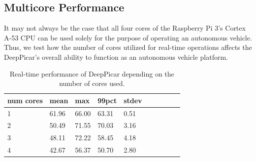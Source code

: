 

\subsection{Multicore Performance}
It may not always be the case that all four cores of the Raspberry Pi 3's Cortex A-53 CPU can be used 
solely for the purpose of operating an autonomous vehicle. Thus, we test how the number of cores 
utilized for real-time operations affects the DeepPicar's overall ability to function as an autonomous 
vehicle platform.

\begin{table}[h]
  \centering
  \begin{tabular} {| l | l | l | l | l | l | l | l | l | l |}
    \hline
    \textbf{num cores} & \textbf{mean} & \textbf{max} & \textbf{99pct} & \textbf{stdev} \\ \hline 
    1 & 61.96 & 66.00 & 63.31 & 0.51\\ \hline
    2 & 50.49 & 71.55 & 70.03 & 3.16 \\ \hline
    3 & 48.11 & 72.22 & 58.45 & 4.18 \\ \hline
    4 & 42.67 & 56.37 & 50.70 & 2.80 \\
    \hline
  \end{tabular}
  \caption{Real-time performance of DeepPicar depending on the number of cores used.}
\end{table}

